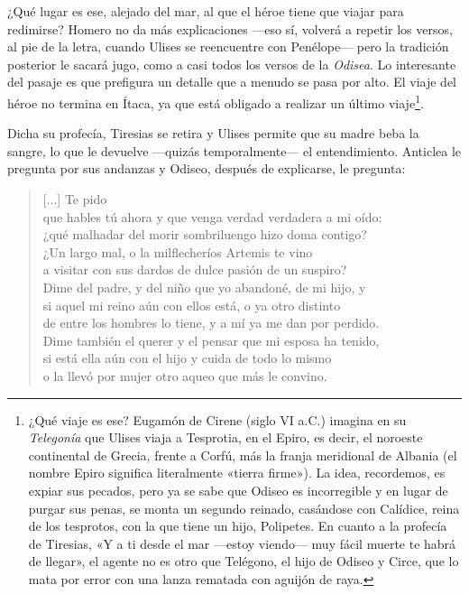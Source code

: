 \documentclass[11pt,a4paper]{article}
\begin{document}
¿Qué lugar es ese, alejado del mar, al que el héroe tiene que viajar para redimirse? Homero no da más explicaciones ---eso sí, volverá a repetir los versos, al pie de la letra, cuando Ulises se reencuentre con Penélope--- pero la tradición posterior le sacará jugo, como a casi todos los versos de la \emph{Odisea}. Lo interesante del pasaje es que prefigura un detalle que a menudo se pasa por alto. El viaje del héroe no termina en Ítaca, ya que está obligado a realizar un último viaje\footnote{¿Qué viaje es ese? Eugamón de Cirene (siglo VI a.C.) imagina en su \emph{Telegonía} que Ulises viaja a Tesprotia, en el Epiro, es decir, el noroeste continental de Grecia, frente a Corfú, más la franja meridional de Albania (el nombre Epiro significa literalmente «tierra firme»). La idea, recordemos, es expiar sus pecados, pero ya se sabe que Odiseo es incorregible y en lugar de purgar sus penas, se monta un segundo reinado, casándose con Calídice, reina de los tesprotos, con la que tiene un hijo, Polipetes. En cuanto a la profecía de Tiresias, «Y a ti desde el mar ---estoy viendo--- muy fácil muerte te habrá de llegar», el agente no es otro que Telégono, el hijo de Odiseo y Circe, que lo mata por error con una lanza rematada con aguijón de raya.}.

Dicha su profecía, Tiresias se retira y Ulises permite que su madre beba la sangre, lo que le devuelve ---quizás temporalmente--- el entendimiento. Anticlea le pregunta por sus andanzas y Odiseo, después de explicarse, le pregunta:

\begin{verse}
[...] Te pido\\
que hables tú ahora y que venga verdad verdadera a mi oído:\\
¿qué malhadar del morir sombriluengo hizo doma contigo?\\
¿Un largo mal, o la milflecheríos Artemis te vino\\
a visitar con sus dardos de dulce pasión de un suspiro?\\
Dime del padre, y del niño que yo abandoné, de mi hijo, y\\
si aquel mi reino aún con ellos está, o ya otro distinto\\
de entre los hombres lo tiene, y a mí ya me dan por perdido.\\
Dime también el querer y el pensar que mi esposa ha tenido,\\
si está ella aún con el hijo y cuida de todo lo mismo\\
o la llevó por mujer otro aqueo que más le convino.
\end{verse}
\end{document}
